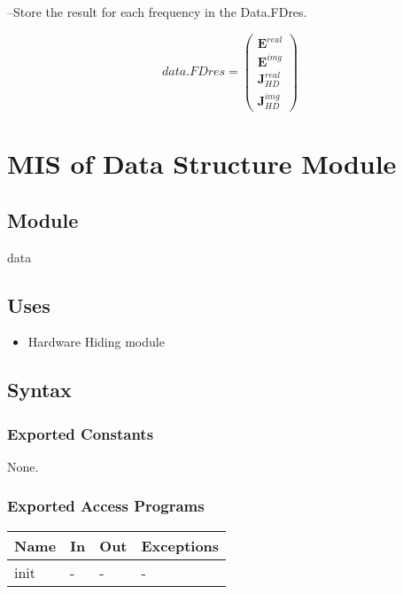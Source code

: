 \documentclass[12pt, titlepage]{article}
\begin{document}
\begin{itemize}
		
		\subitem --Store the result for each frequency in the Data.FDres.
		
		\begin{equation*} data.FDres = \begin{pmatrix} \textbf{E}^{real}\\
				\textbf{E}^{img}\\ \textbf{J}^{real}_{HD}\\ \textbf{J}^{img}_{HD} \end{pmatrix}
		\end{equation*}
		
	\end{itemize}
	
	\newpage %
	\section{MIS of Data Structure Module} \label{DSM}
	
	\subsection{Module} data
	
	\subsection{Uses} \begin{itemize} \item Hardware Hiding module \end{itemize}
	
	\subsection{Syntax}
	
	\subsubsection{Exported Constants} None. \subsubsection{Exported Access
		Programs}
	
	\begin{center} \begin{tabular}{p{2cm} p{4cm} p{4cm} p{2cm}} \hline \textbf{Name}
			& \textbf{In} & \textbf{Out} & \textbf{Exceptions} \\ \hline init & - & - & - \\
			\hline \end{tabular} \end{center}
	
\end{document}
